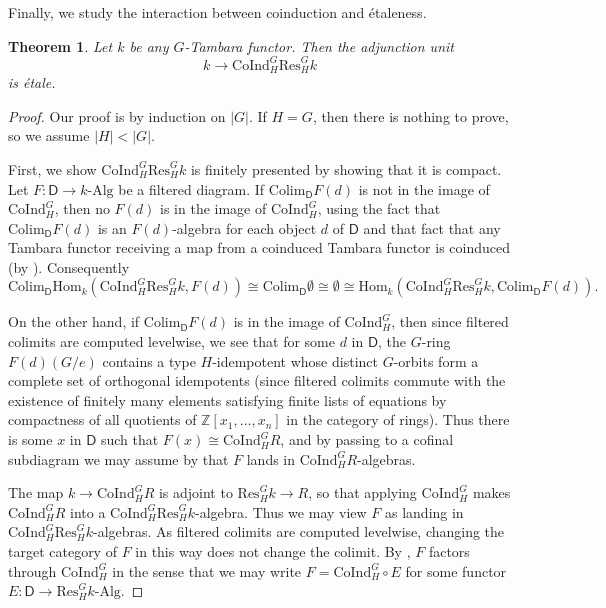 \documentclass[11pt,dvipsnames]{amsart}
\newcommand{\Z}{\mathbb{Z}}
\newtheorem{theorem}{Theorem}[section]
\theoremstyle{BoldRemark}
\newcommand{\Res}{\mathrm{Res}}
\newcommand{\Coind}{\mathrm{CoInd}}
\newcommand{\Hom}{\mathrm{Hom}}
\newcommand{\colim}{\mathrm{Colim}}
\newcommand{\Alg}{\mathrm{Alg}}
\begin{document}
Finally, we study the interaction between coinduction and \'{e}taleness.

\begin{theorem}\label{thm:coind-are-etale}
	Let $k$ be any $G$-Tambara functor. Then the adjunction unit 
	\[ 
		k \rightarrow \Coind_H^G \Res_H^G k
	\] 
	is \'{e}tale.
\end{theorem}

\begin{proof}
    Our proof is by induction on $|G|$. If $H = G$, then there is nothing to prove, so we assume $|H| < |G|$.
    
    First, we show $\Coind_H^G \Res_H^G k$ is finitely presented by showing that it is compact. Let $F : \mathsf{D} \rightarrow k \text{-} \Alg$ be a filtered diagram. If $\colim_{\mathsf{D}} F(d)$ is not in the image of $\Coind_H^G$, then no $F(d)$ is in the image of $\Coind_H^G$, using the fact that $\colim_{\mathsf{D}} F(d)$ is an $F(d)$-algebra for each object $d$ of $\mathsf{D}$ and that fact that any Tambara functor receiving a map from a coinduced Tambara functor is coinduced (by \cite[Corollary G]{Wis25a}). Consequently 
    \[ 
        \colim_{\mathsf{D}} \Hom_k(\Coind_H^G \Res_H^G k, F(d)) \cong \colim_{\mathsf{D}} \emptyset \cong \emptyset \cong \Hom_k(\Coind_H^G \Res_H^G k, \colim_{\mathsf{D}} F(d)) .
    \]
    
    On the other hand, if $\colim_{\mathsf{D}} F(d)$ is in the image of $\Coind_H^G$, then since filtered colimits are computed levelwise, we see that for some $d$ in $\mathsf{D}$, the $G$-ring $F(d)(G/e)$ contains a type $H$-idempotent whose distinct $G$-orbits form a complete set of orthogonal idempotents (since filtered colimits commute with the existence of finitely many elements satisfying finite lists of equations by compactness of all quotients of $\Z[x_1,\dots,x_n]$ in the category of rings). Thus there is some $x$ in $\mathsf{D}$ such that $F(x) \cong \Coind_H^G R$, and by passing to a cofinal subdiagram we may assume by \cite[Corollary G]{Wis25a} that $F$ lands in $\Coind_H^G R$-algebras. 
    
    The map $k \rightarrow \Coind_H^G R$ is adjoint to $\Res_H^G k \rightarrow R$, so that applying $\Coind_H^G$ makes $\Coind_H^G R$ into a $\Coind_H^G \Res_H^G k$-algebra. Thus we may view $F$ as landing in $\Coind_H^G \Res_H^G k$-algebras. As filtered colimits are computed levelwise, changing the target category of $F$ in this way does not change the colimit. By \cite[Corollary G]{Wis25a}, $F$ factors through $\Coind_H^G$ in the sense that we may write $F = \Coind_H^G \circ E$ for some functor $E : \mathsf{D} \rightarrow \Res_H^G k \text{-} \Alg$.


\end{proof}
\end{document}
